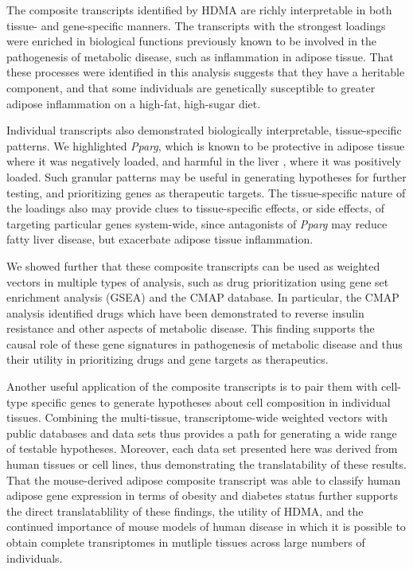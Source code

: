 \documentclass[
]{article}
\begin{document}
The composite transcripts identified by HDMA are richly interpretable in
both tissue- and gene-specific manners. The transcripts with the
strongest loadings were enriched in biological functions previously
known to be involved in the pathogenesis of metabolic disease, such as
inflammation in adipose tissue. That these processes were identified in
this analysis suggests that they have a heritable component, and that
some individuals are genetically susceptible to greater adipose
inflammation on a high-fat, high-sugar diet.

Individual transcripts also demonstrated biologically interpretable,
tissue-specific patterns. We highlighted \textit{Pparg}, which is known
to be protective in adipose tissue \cite{pmid17389767} where it was
negatively loaded, and harmful in the liver
\cite{pmid12805374, pmid12618528, 
pmid16357043, pmid15644454, pmid16403437}, where it was positively
loaded. Such granular patterns may be useful in generating hypotheses
for further testing, and prioritizing genes as therapeutic targets. The
tissue-specific nature of the loadings also may provide clues to
tissue-specific effects, or side effects, of targeting particular genes
system-wide, since antagonists of \textit{Pparg} may reduce fatty liver
disease, but exacerbate adipose tissue inflammation.

We showed further that these composite transcripts can be used as
weighted vectors in multiple types of analysis, such as drug
prioritization using gene set enrichment analysis (GSEA) and the CMAP
database. In particular, the CMAP analysis identified drugs which have
been demonstrated to reverse insulin resistance and other aspects of
metabolic disease. This finding supports the causal role of these gene
signatures in pathogenesis of metabolic disease and thus their utility
in prioritizing drugs and gene targets as therapeutics.

Another useful application of the composite transcripts is to pair them
with cell-type specific genes to generate hypotheses about cell
composition in individual tissues. Combining the multi-tissue,
transcriptome-wide weighted vectors with public databases and data sets
thus provides a path for generating a wide range of testable hypotheses.
Moreover, each data set presented here was derived from human tissues or
cell lines, thus demonstrating the translatability of these results.
That the mouse-derived adipose composite transcript was able to classify
human adipose gene expression in terms of obesity and diabetes status
further supports the direct translatablility of these findings, the
utility of HDMA, and the continued importance of mouse models of human
disease in which it is possible to obtain complete transriptomes in
mutliple tissues across large numbers of individuals.
\end{document}
